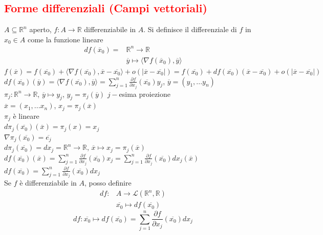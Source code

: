 \documentclass{article}
\newcommand{\R}{\mathbb{R}}
\begin{document}
\subsection{\textcolor{red}{Forme differenziali (Campi vettoriali)}}
$A \subseteq \R^n$ aperto, $f:A \rightarrow \R$ differenziabile in $A$. Si definisce il differenziale di $f$ in $x_0 \in A$ come la funzione lineare 
\begin{align*}
    df(\overline{x}_0)=&\R^n\rightarrow\R\\
    &\overline{y}\mapsto \langle \nabla f(\overline{x}_0),\overline{y} \rangle
\end{align*}
$f(\overline{x})=f(\overline{x_0})+\langle \nabla f (\overline{x_0}),\overline{x}-\overline{x_0} \rangle + o(|\overline{x}-\overline{x_0}|)=f(\overline{x_0})+df(\overline{x_0})(\overline{x}-\overline{x_0})+o(|\overline{x}-\overline{x_0}|)$\\
$df(\overline{x_0})(\overline{y})=\langle \nabla f (\overline{x_0}),\overline{y}\rangle =\sum_{j=1}^n\frac{\partial f}{\partial x_j}(\overline{x_0})y_j$, $\overline{y}=(y_1,...y_n)$\\
$\pi_j: \R^n \rightarrow \R$, $\overline{y}\mapsto y_j$, $y_j=\pi_j(\overline{y})$ $j-$esima proiezione\\
$\overline{x}=(x_1,...x_n)$, $x_j=\pi_j(\overline{x})$\\
$\pi_j$ è lineare\\
$d \pi_j (\overline{x_0})(\overline{x})=\pi_j(x)=x_j$\\
$\nabla \pi_j (\overline{x_0})=\overline{e_j}$\\
$d \pi _j (\overline{x_0})=dx_j= \R^n \rightarrow \R$, $\overline{x} \mapsto x_j=\pi_j(\overline{x})$\\
$df(\overline{x_0})(\overline{x})=\sum_{j=1}^n \frac{\partial f}{\partial x_j}(\overline{x_0})x_j=\sum_{j=1}^n \frac{\partial f}{\partial x_j}(\overline{x_0})dx_j(\overline{x})$\\
$df(\overline{x_0})=\sum_{j=1}^n \frac{\partial f}{\partial x_j} (\overline{x_0})dx_j$\\
Se $f$ è differenziabile in $A$, posso definire
\begin{align*}
    df: &A \rightarrow \mathcal{L}(\R^n,\R)\\
    &\overline{x_0} \mapsto df(\overline{x_0})
\end{align*}
\begin{equation*}
    df: \overline{x_0} \mapsto df(\overline{x_0})=\sum_{j=1}^n \frac{\partial f}{\partial x_j}(\overline{x_0})dx_j
\end{equation*}
\end{document}
